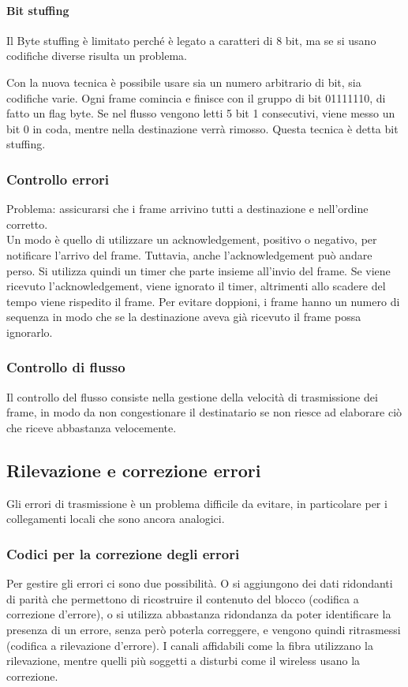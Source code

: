 \paragraph{Bit stuffing}
Il Byte stuffing è limitato perché è legato a caratteri di 8 bit, ma se si usano codifiche diverse risulta un problema.

Con la nuova tecnica è possibile usare sia un numero arbitrario di bit, sia codifiche varie.
Ogni frame comincia e finisce con il gruppo di bit 01111110, di fatto un flag byte. 
Se nel flusso vengono letti 5 bit 1 consecutivi, viene messo un bit 0 in coda, mentre nella destinazione verrà rimosso.
Questa tecnica è detta bit stuffing.

\subsubsection{Controllo errori}
Problema: assicurarsi che i frame arrivino tutti a destinazione e nell'ordine corretto.\\
Un modo è quello di utilizzare un acknowledgement, positivo o negativo, per notificare l'arrivo del frame.
Tuttavia, anche l'acknowledgement può andare perso. Si utilizza quindi un timer che parte insieme all'invio del frame.
Se viene ricevuto l'acknowledgement, viene ignorato il timer, altrimenti allo scadere del tempo viene rispedito il frame.
Per evitare doppioni, i frame hanno un numero di sequenza in modo che se la destinazione aveva già ricevuto il frame possa ignorarlo.

\subsubsection{Controllo di flusso}
Il controllo del flusso consiste nella gestione della velocità di trasmissione dei frame,
in modo da non congestionare il destinatario se non riesce ad elaborare ciò che riceve abbastanza velocemente.

\subsection{Rilevazione e correzione errori} %
Gli errori di trasmissione è un problema difficile da evitare, in particolare per i collegamenti locali che sono ancora analogici.

\subsubsection{Codici per la correzione degli errori}
Per gestire gli errori ci sono due possibilità. 
O si aggiungono dei dati ridondanti di parità che permettono di ricostruire il contenuto del blocco (codifica a correzione d'errore),
o si utilizza abbastanza ridondanza da poter identificare la presenza di un errore, senza però poterla correggere, e vengono quindi ritrasmessi (codifica a rilevazione d'errore).
I canali affidabili come la fibra utilizzano la rilevazione, mentre quelli più soggetti a disturbi come il wireless usano la correzione.

